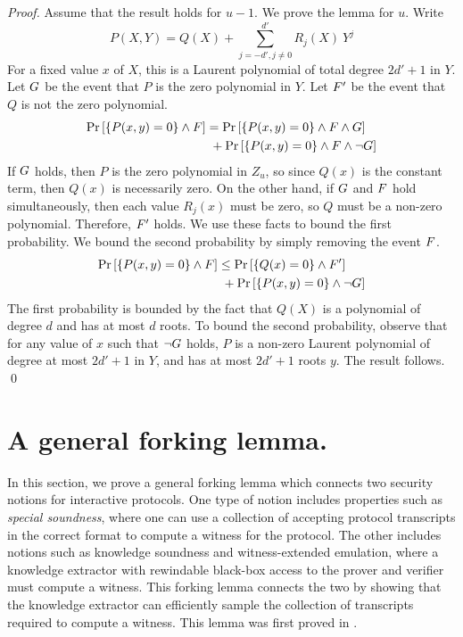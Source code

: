 \begin{proof}
Assume that the result holds for $u-1$. We prove the lemma for $u$. Write
\[
P(X,Y) = Q(X) + \sum_{j=-d', j \neq 0}^{d'} R_{j}(X) \ Y^{j}
\]
For a fixed value $x$ of $X$, this is a Laurent polynomial of total degree $2d'+1$ in $Y$. Let $G$ be the event that $P$ is the zero polynomial in $Y$. Let $F'$ be the event that $Q$ is not the zero polynomial.
\begin{align*}
\Pr \left[ \lbrace P(x,y) = 0 \rbrace \wedge F \right] &= \Pr \left[ \lbrace P(x,y) = 0 \rbrace \wedge F \wedge G\right] \\
& ~ + \Pr \left[ \lbrace P(x,y) = 0 \rbrace \wedge F \wedge \neg G\right] \\
\end{align*}
If $G$ holds, then $P$ is the zero polynomial in $Z_u$, so since $Q(x)$ is the constant term, then $Q(x)$ is necessarily zero. On the other hand, if $G$ and $F$ hold simultaneously, then each value $R_j(x)$ must be zero, so $Q$ must be a non-zero polynomial. Therefore, $F'$ holds. We use these facts to bound the first probability. We bound the second probability by simply removing the event $F$.
\begin{align*}
\Pr \left[ \lbrace P(x,y) = 0 \rbrace \wedge F \right] &\leq \Pr \left[ \lbrace Q(x) = 0 \rbrace \wedge F' \right] \\
& ~ + \Pr \left[ \lbrace P(x,y) = 0 \rbrace \wedge \neg G \right] \\
\end{align*}
The first probability is bounded by the fact that $Q(X)$ is a polynomial of degree $d$ and has at most $d$ roots. To bound the second probability, observe that for any value of $x$ such that $\neg G$ holds, $P$ is a non-zero Laurent polynomial of degree at most $2d'+1$ in $Y$, and has at most $2d'+1$ roots $y$. The result follows.
\qed
\end{proof}

\section{A general forking lemma.}

In this section, we prove a general forking lemma which connects two security notions for interactive protocols. One type of notion includes properties such as \emph{special soundness}, where one can use a collection of accepting protocol transcripts in the correct format to compute a witness for the protocol. The other includes notions such as knowledge soundness and witness-extended emulation, where a knowledge extractor with rewindable black-box access to the prover and verifier must compute a witness. This forking lemma connects the two by showing that the knowledge extractor can efficiently sample the collection of transcripts required to compute a witness. This lemma was first proved in \cite{BootleCCGP16}.

